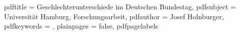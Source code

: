 \newcommand\myName{Josef Holnburger}
\newcommand\myStreetAddress{XXX}
\newcommand\myCityAddress{XXX}
\newcommand\myEmail{josef@holnburger.com}
\newcommand\myKeywords{} %
\newcommand\myMatNr{XXX}
\newcommand\myTitle{Geschlechterunterschiede im Deutschen Bundestag}
\newcommand\mySubTitle{Arbeitstitel}
\newcommand\thesisType{Forschungsarbeit}
\newcommand\fachbereich{Sozialwissenschaften} 
\newcommand\fachgebiet{Politikwissenschaft}
\newcommand\courseOfStudies{Musterseminar}
\newcommand\supervisorType{Dozenten} %
\newcommand\supervisor{Prof. Dr. Kai-Uwe Schnapp \\ PD Dr. Falk Daviter}
\newcommand\currentSemester{Wintersemester 2018/19}
\newcommand\dateOfSubmission{tba}

\hypersetup
  {
  	pdftitle     = \myTitle,
  	pdfsubject   = {Universität Hamburg, \thesisType},
  	pdfauthor    = \myName,
  	pdfkeywords  = \myKeywords,
  	plainpages   = false, pdfpagelabels
  }